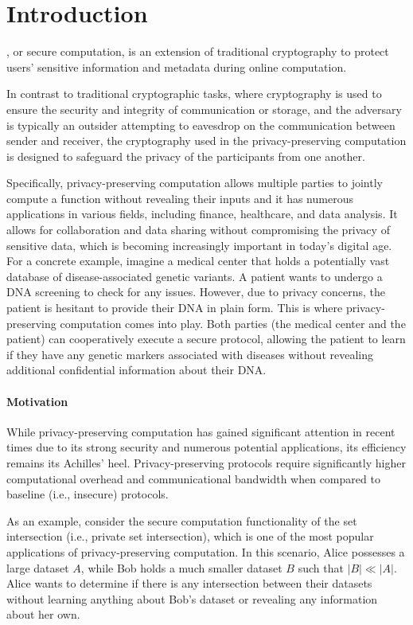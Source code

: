 \chapter{Introduction}
\label{introduction}

, or secure computation,
is an extension of traditional cryptography to protect users' sensitive information and metadata during online computation.

In contrast to traditional cryptographic tasks, where cryptography is used to ensure the security and integrity of communication or storage, and the adversary is typically an outsider attempting to eavesdrop on the communication between sender and receiver, the cryptography used in the privacy-preserving computation is designed to safeguard the privacy of the participants from one another.

Specifically, privacy-preserving computation allows multiple parties to jointly compute a function without revealing their inputs and it has numerous applications in various fields, including finance, healthcare, and data analysis. It allows for collaboration and data sharing without compromising the privacy of sensitive data, which is becoming increasingly important in today's digital age.
For a concrete example, imagine a medical center that holds a potentially vast database of disease-associated genetic variants. A patient wants to undergo a DNA screening to check for any issues. However, due to privacy concerns, the patient is hesitant to provide their DNA in plain form. This is where privacy-preserving computation comes into play. Both parties (the medical center and the patient) can cooperatively execute a secure protocol, allowing the patient to learn if they have any genetic markers associated with diseases without revealing additional confidential information about their DNA.

\subsubsection{Motivation}
While privacy-preserving computation has gained significant attention in recent times due to its strong security and numerous potential applications, its efficiency remains its Achilles' heel. Privacy-preserving protocols require significantly higher computational overhead and communicational bandwidth when compared to baseline (i.e., insecure) protocols.

As an example, consider the secure computation functionality of the set intersection (i.e., private set intersection), which is one of the most popular applications of privacy-preserving computation. In this scenario, Alice possesses a large dataset $A$, while Bob holds a much smaller dataset $B$ such that $|B| \ll |A|$. Alice wants to determine if there is any intersection between their datasets without learning anything about Bob's dataset or revealing any information about her own.

